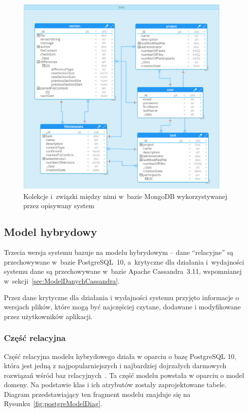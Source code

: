 \begin{figure}[!ht]
\centering
\includegraphics[width=0.95\textwidth]{figures/mongo_model.png}
\caption{Kolekcje i~związki między nimi w~bazie MongoDB wykorzystywanej przez opisywany system}
\label{fig:MongoSchema}
\end{figure}

\subsection{Model hybrydowy} \label{sec:hybridModel}

Trzecia wersja systemu bazuje na modelu hybrydowym -- dane \enquote{relacyjne} są przechowywane w~bazie PostgreSQL~10, a~krytyczne dla działania i~wydajności systemu dane są przechowywane w~bazie Apache Cassandra~3.11, wspomnianej w~sekcji~\ref{sec:ModelDanychCassandra}.

Przez dane krytyczne dla działania i wydajności systemu przyjęto informacje o wersjach plików, które mogą być najczęściej czytane, dodawane i modyfikowane przez użytkowników aplikacji.

\subsubsection{Część relacyjna}

Część relacyjna modelu hybrydowego działa w oparciu o bazę PostgreSQL 10, która jest jedną z najpopularniejszych i najbardziej dojrzałych darmowych rozwiązań wśród baz relacyjnych~\cite{DBEnginesRankingRDBMS}.
Ta część modelu powstała w oparciu o model domeny.
Na podstawie klas i ich atrybutów zostały zaprojektowane tabele.
Diagram przedstawiający ten fragment modelu znajduje się na Rysunku~\ref{fig:postgreModelDiag}.

